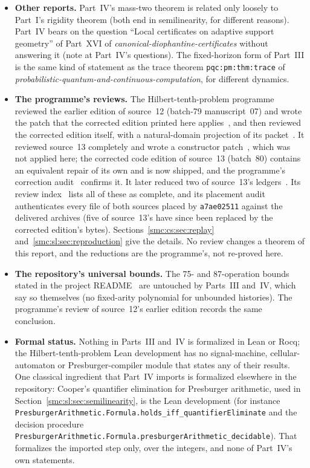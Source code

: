 \documentclass[11pt,letterpaper]{article}
\numberwithin{equation}{section}
\theoremstyle{definition}
\theoremstyle{remark}
\begin{document}
\begin{itemize}
\item \textbf{Other reports.} Part~IV's mass-two theorem is related only loosely to Part~I's rigidity theorem (both end in semilinearity, for different reasons). Part~IV bears on the question ``Local certificates on adaptive support geometry'' of Part~XVI of \emph{canonical-diophantine-certificates} without answering it (note at Part~IV's questions). The fixed-horizon form of Part~III is the same kind of statement as the trace theorem \texttt{pqc:pm:thm:trace} of \emph{probabilistic-quantum-and-continuous-computation}, for different dynamics.
\item \textbf{The programme's reviews.} The Hilbert-tenth-problem programme reviewed the earlier edition of source~12 (batch-79 manuscript~07) and wrote the patch that the corrected edition printed here applies~\cite{reviewcs}, and then reviewed the corrected edition itself, with a natural-domain projection of its packet~\cite{reviewcsc}. It reviewed source~13 completely and wrote a constructor patch~\cite{reviewsl}, which was not applied here; the corrected code edition of source~13 (batch~80) contains an equivalent repair of its own and is now shipped, and the programme's correction audit~\cite{reviewbeighty} confirms it. It later reduced two of source~13's ledgers~\cite{reviewslproj,reviewcong}. Its review index~\cite{reviewaebfa} lists all of these as complete, and its placement audit~\cite{reviewplace} authenticates every file of both sources placed by \texttt{a7ae02511} against the delivered archives (five of source~13's have since been replaced by the corrected edition's bytes). Sections~\ref{smc:cs:sec:replay} and~\ref{smc:sl:sec:reproduction} give the details. No review changes a theorem of this report, and the reductions are the programme's, not re-proved here.
\item \textbf{The repository's universal bounds.} The 75- and 87-operation bounds stated in the project README~\cite{repo} are untouched by Parts~III and~IV, which say so themselves (no fixed-arity polynomial for unbounded histories). The programme's review of source~12's earlier edition records the same conclusion.
\item \textbf{Formal status.} Nothing in Parts~III and~IV is formalized in Lean or Rocq; the Hilbert-tenth-problem Lean development has no signal-machine, cellular-automaton or Presburger-compiler module that states any of their results. One classical ingredient that Part~IV imports is formalized elsewhere in the repository: Cooper's quantifier elimination for Presburger arithmetic, used in Section~\ref{smc:sl:sec:semilinearity}, is the Lean development  (for instance \texttt{PresburgerArithmetic.Formula.holds\_iff\_quantifierEliminate} and the decision procedure \texttt{PresburgerArithmetic.Formula.presburgerArithmetic\_decidable}). That formalizes the imported step only, over the integers, and none of Part~IV's own statements.
\end{itemize}
\end{document}
